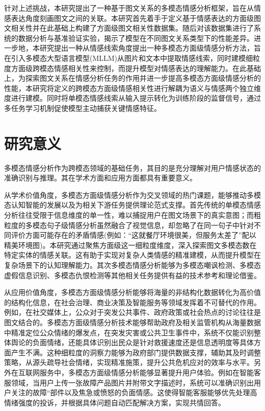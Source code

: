 针对上述挑战，本研究提出了一种基于图文关系的多模态情感分析框架，旨在从情感表达角度刻画图文之间的关联。本研究首先着手于定义基于情感表达的方面级图文相关性并在此基础上构建了方面级图文相关性数据集。随后对该数据集进行了系统的数据分析与基准验证实验，揭示了模型在不同图文关系类型下的性能差异。进一步地，本研究提出一种从情感线索角度提出一种多模态方面级情感分析方法，旨在引入多模态大型语言模型(MLLM)从图片和文本中提取情感线索，同时建模细粒度方面级跨模态情感相关性来控制，而提升模型对情感表达的理解能力。在此基础上，为探索图文关系在情感分析任务的作用并进一步提高多模态方面级情感分析的性能，本研究将定义的跨模态方面级情感相关性进行解耦为语义与情感两个独立维度进行建模。同时将单模态情感线索从输入提示转化为训练阶段的监督信号，通过多任务学习机制促使模型主动捕获关键情感特征。


\section{研究意义}
多模态情感分析作为跨模态领域的基础任务，其目的是充分理解对用户情感状态的准确识别与推理。其在学术方面和应用方面都具有重要意义。

从学术价值角度，多模态方面级情感分析作为交叉领域的热门课题，能够推动多模态认知智能的发展以及为相关下游任务提供理论范式支撑\cite{das2023multimodal}。首先传统的单模态情感分析往往受限于信息维度的单一性，难以捕捉用户在图文场景下的真实意图；而粗粒度的多模态句子级情感分析虽然融合了视觉信息，却忽略了在同一句子中针对不同评价方面可能存在的矛盾情感(例如：“这就餐厅环境很美，但服务太差了”配以精美环境图)。本研究通过聚焦方面级这一细粒度维度，深入探索图文多模态数在特定实体的情感关联。这有助于实现对复杂人类情感的精准建模，从而提升模型在复杂场景下的认知理解能力。其次多模态情感分析能够为多模态嘲讽检测\cite{vitman2023sarcasm,zhangm2seq2seq}、多模态虚假信息识别\cite{zhang2021mining}、多模态仇恨检测\cite{yang2022multimodal}等其他相关任务提供有益的技术参考和理论借鉴。

从应用价值角度，多模态方面级情感分析能够将海量的非结构化数据转化为高价值的结构化信息，在社会治理、商业决策及智能服务等领域发挥着不可替代的作用\cite{zhao2024survey}。例如，在社交媒体上，公众对于突发公共事件、政府政策或社会热点的讨论往往是图文结合的。多模态方面级情感分析技术能够帮助政府及相关监管机构从海量数据中精准定位公众情绪的爆发点，在突发灾害或公共卫生事件中，系统不仅能识别整体舆论的负面情绪，还能具体识别出民众是针对救援速度还是信息透明度等具体方面产生不满。这种细粒度的洞察力能够为政府部门提供数据支撑，辅助其及时调整策略，从源头疏导社会情绪，实现精准施策，提升公共危机应对的效率与水平。另外在互联网服务中，多模态方面级情感分析能够显著提升用户体验。例如在智能客服领域，当用户上传一张故障产品图片并附带文字描述时，系统可以准确识别出用户关注的故障“部件以及焦急或愤怒的负面情感。这使得智能客服能够优先处理高情绪强度的投诉，并根据具体问题自动匹配解决方案，实现共情回答。

